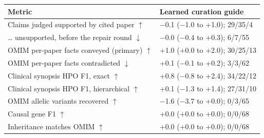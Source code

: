\documentclass{article} %
\begin{document}
\begin{table}[!htb]
\begin{tabularx}{\linewidth}{>{\raggedright\arraybackslash}p{5.6cm}>{\centering\arraybackslash}X}
\toprule
Metric & Learned curation guide \\
\midrule
Claims judged supported by cited paper $\uparrow$ & $-$0.1 ($-$1.0 to +1.0); 29/35/4 \\
\ldots{} unsupported, before the repair round $\downarrow$ & $-$0.0 ($-$0.4 to +0.3); 6/7/55 \\
OMIM per-paper facts conveyed (primary) $\uparrow$ & +1.0 (+0.0 to +2.0); 30/25/13 \\
OMIM per-paper facts contradicted $\downarrow$ & +0.1 ($-$0.1 to +0.2); 3/3/62 \\
Clinical synopsis HPO F1, exact $\uparrow$ & +0.8 ($-$0.8 to +2.4); 34/22/12 \\
Clinical synopsis HPO F1, hierarchical $\uparrow$ & +0.1 ($-$1.3 to +1.4); 27/31/10 \\
OMIM allelic variants recovered $\uparrow$ & $-$1.6 ($-$3.7 to +0.0); 0/3/65 \\
Causal gene F1 $\uparrow$ & +0.0 (+0.0 to +0.0); 0/0/68 \\
Inheritance matches OMIM $\uparrow$ & +0.0 (+0.0 to +0.0); 0/0/68 \\
\bottomrule
\end{tabularx}
\end{table}

\FloatBarrier
\FloatBarrier
\end{document}
